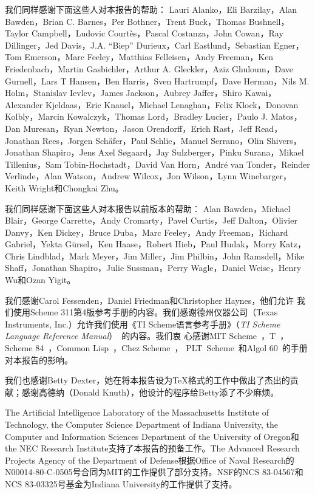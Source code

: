 我们同样感谢下面这些人对本报告的帮助： Lauri Alanko，Eli Barzilay，Alan Bawden，Brian C. Barnes，Per Bothner，Trent Buck，Thomas Bushnell，Taylor Campbell，Ludovic Courtès，Pascal Costanza，John Cowan，Ray Dillinger，Jed Davis，J.A. “Biep” Durieux，Carl Eastlund，Sebastian Egner，Tom Emerson，Marc Feeley，Matthias Felleisen，Andy Freeman，Ken Friedenbach，Martin Gasbichler，Arthur A. Gleckler，Aziz Ghuloum，Dave Gurnell，Lars T Hansen，Ben Harris，Sven Hartrumpf，Dave Herman，Nils M. Holm，Stanislav Ievlev，James Jackson，Aubrey Jaffer，Shiro Kawai，Alexander Kjeldaas，Eric Knauel，Michael Lenaghan，Felix Klock，Donovan Kolbly，Marcin Kowalczyk，Thomas Lord，Bradley Lucier，Paulo J. Matos，Dan Muresan，Ryan Newton，Jason Orendorff，Erich Rast，Jeff Read，Jonathan Rees，Jorgen Schäfer，Paul Schlie，Manuel Serrano，Olin Shivers，Jonathan Shapiro，Jens Axel Søgaard，Jay Sulzberger，Pinku Surana，Mikael Tillenius，Sam Tobin-Hochstadt，David Van Horn，André van Tonder，Reinder Verlinde，Alan Watson，Andrew Wilcox，Jon Wilson，Lynn Winebarger，Keith Wright和Chongkai Zhu。

我们同样感谢下面这些人对本报告以前版本的帮助： Alan Bawden，Michael Blair，George Carrette，Andy Cromarty，Pavel Curtis，Jeff Dalton，Olivier Danvy，Ken Dickey，Bruce Duba，Marc Feeley，Andy Freeman，Richard Gabriel，Yekta Gürsel，Ken Haase，Robert Hieb，Paul Hudak，Morry Katz，Chris Lindblad，Mark Meyer，Jim Miller，Jim Philbin，John Ramsdell，Mike Shaff，Jonathan Shapiro，Julie Sussman，Perry Wagle，Daniel Weise，Henry Wu和Ozan Yigit。

我们感谢Carol Fessenden，Daniel Friedman和Christopher Haynes，他们允许
我们使用Scheme 311第4版参考手册的内容。我们感谢德州仪器公司（Texas
Instruments, Inc.）允许我们使用《TI Scheme语言参考手册》（{\em TI
  Scheme Language Reference Manual}）~\cite{TImanual85}的内容。我们衷
心感谢MIT Scheme~\cite{MITScheme}，T~\cite{Rees84}，Scheme
84~\cite{Scheme84}，Common Lisp~\cite{CLtL}，Chez Scheme~\cite{csug7}，
PLT~Scheme~\cite{mzscheme352}和Algol 60~\cite{Naur63}的手册对本报告的影响。

\vest{}我们也感谢Betty Dexter，她在将本报告设为\TeX{}格式的工作中做出了杰出的贡献；感谢高德纳（Donald Knuth），他设计的程序给Betty添了不少麻烦。

\vest The Artificial Intelligence Laboratory of the Massachusetts Institute of Technology, the Computer Science Department of Indiana University, the Computer and Information Sciences Department of the University of Oregon和the NEC Research Institute支持了本报告的预备工作。The Advanced Research Projects Agency of the Department of Defense根据Office of Naval Research的N00014-80-C-0505号合同为MIT的工作提供了部分支持。NSF的NCS 83-04567和NCS 83-03325号基金为Indiana University的工作提供了支持。


